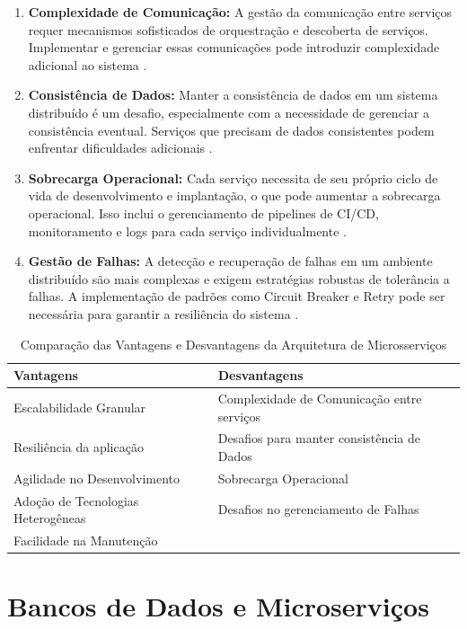 \begin{enumerate}
    \item \textbf{Complexidade de Comunicação:} A gestão da comunicação entre serviços requer mecanismos sofisticados de orquestração e descoberta de serviços. Implementar e gerenciar essas comunicações pode introduzir complexidade adicional ao sistema \cite{dragoni2017}.
    \item \textbf{Consistência de Dados:} Manter a consistência de dados em um sistema distribuído é um desafio, especialmente com a necessidade de gerenciar a consistência eventual. Serviços que precisam de dados consistentes podem enfrentar dificuldades adicionais \cite{richardson2018}.
    \item \textbf{Sobrecarga Operacional:} Cada serviço necessita de seu próprio ciclo de vida de desenvolvimento e implantação, o que pode aumentar a sobrecarga operacional. Isso inclui o gerenciamento de pipelines de CI/CD, monitoramento e logs para cada serviço individualmente \cite{fowler2014}.
    \item \textbf{Gestão de Falhas:} A detecção e recuperação de falhas em um ambiente distribuído são mais complexas e exigem estratégias robustas de tolerância a falhas. A implementação de padrões como Circuit Breaker e Retry pode ser necessária para garantir a resiliência do sistema \cite{newman2019}.
\end{enumerate}

\begin{table}[h]
\centering
\caption{Comparação das Vantagens e Desvantagens da Arquitetura de Microsserviços}
\begin{tabular}{|p{5cm}|p{5cm}|}
\hline
\textbf{Vantagens} & \textbf{Desvantagens} \\ \hline
Escalabilidade Granular & Complexidade de Comunicação entre serviços \\ \hline
Resiliência da aplicação & Desafios para manter consistência de Dados \\ \hline
Agilidade no Desenvolvimento & Sobrecarga Operacional \\ \hline
Adoção de Tecnologias Heterogêneas & Desafios no gerenciamento de Falhas \\ \hline
Facilidade na Manutenção & \\ \hline
\end{tabular}
\label{tab:vantagens_desvantagens}
\end{table}



\section{Bancos de Dados e Microserviços}

